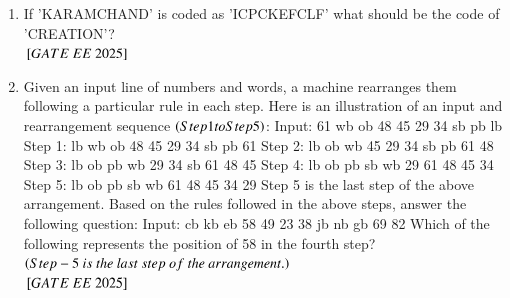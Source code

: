 \documentclass[journal,12pt,onecolumn]{IEEEtran}
\theoremstyle{remark}
\begin{document}
\begin{enumerate}
  \item If 'KARAMCHAND' is coded as 'ICPCKEFCLF' what should be the code of 'CREATION'? \\    
\hfill ${}\left[GATE\ EE\ 2025\right]$
    \begin{enumerate}
    \end{enumerate}
   \item { Given an input line of numbers and words, a machine rearranges them following a particular rule in each step. Here is an illustration of an input and rearrangement sequence  $\left(Step 1 to Step 5\right)$: \newline
Input: 61 wb ob 48 45 29 34 sb pb lb \newline
Step 1: lb wb ob 48 45 29 34 sb pb 61 \newline
Step 2: lb ob wb 45 29 34 sb pb 61 48 \newline
Step 3: lb ob pb wb 29 34 sb 61 48 45 \newline
Step 4: lb ob pb sb wb 29 61 48 45 34 \newline
Step 5: lb ob pb sb wb 61 48 45 34 29 \newline
Step 5 is the last step of the above arrangement. \newline
Based on the rules followed in the above steps, answer the following question: \newline
Input: cb kb eb 58 49 23 38 jb nb gb 69 82 \newline
Which of the following represents the position of 58 in the fourth step?\\ $\brak{Step-5\ is\ the\ last\ step\ of\ the\ arrangement.}$ } \\   
\hfill ${}\left[GATE\ EE\ 2025\right]$
    \begin{enumerate}
      \end{enumerate}


\end{enumerate}
\end{document}
